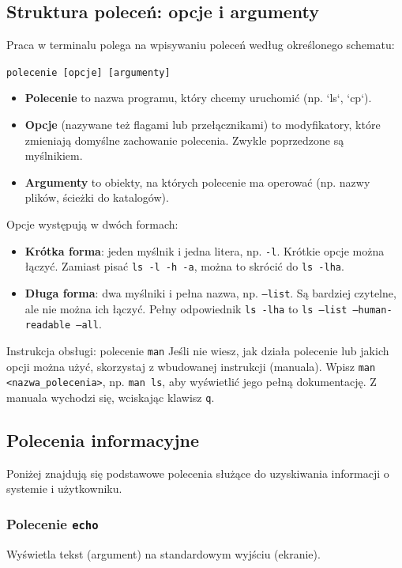 \subsection{Struktura poleceń: opcje i argumenty}
Praca w terminalu polega na wpisywaniu poleceń według określonego schematu:
\begin{center}
\texttt{polecenie [opcje] [argumenty]}
\end{center}
\begin{itemize}
    \item \textbf{Polecenie} to nazwa programu, który chcemy uruchomić (np. `ls`, `cp`).
    \item \textbf{Opcje} (nazywane też flagami lub przełącznikami) to modyfikatory, które zmieniają domyślne zachowanie polecenia. Zwykle poprzedzone są myślnikiem.
    \item \textbf{Argumenty} to obiekty, na których polecenie ma operować (np. nazwy plików, ścieżki do katalogów).
\end{itemize}

Opcje występują w dwóch formach:
\begin{itemize}
    \item \textbf{Krótka forma}: jeden myślnik i jedna litera, np. \texttt{-l}. Krótkie opcje można łączyć. Zamiast pisać \texttt{ls -l -h -a}, można to skrócić do \texttt{ls -lha}.
    \item \textbf{Długa forma}: dwa myślniki i pełna nazwa, np. \texttt{--list}. Są bardziej czytelne, ale nie można ich łączyć. Pełny odpowiednik \texttt{ls -lha} to \texttt{ls --list --human-readable --all}.
\end{itemize}

\begin{importantbox}{Instrukcja obsługi: polecenie \texttt{man}}
Jeśli nie wiesz, jak działa polecenie lub jakich opcji można użyć, skorzystaj z wbudowanej instrukcji (manuala). Wpisz \texttt{man <nazwa\_polecenia>}, np. \texttt{man ls}, aby wyświetlić jego pełną dokumentację. Z manuala wychodzi się, wciskając klawisz \texttt{q}.
\end{importantbox}

\subsection{Polecenia informacyjne}
Poniżej znajdują się podstawowe polecenia służące do uzyskiwania informacji o systemie i użytkowniku.

\subsubsection*{Polecenie \texttt{echo}}
Wyświetla tekst (argument) na standardowym wyjściu (ekranie).

